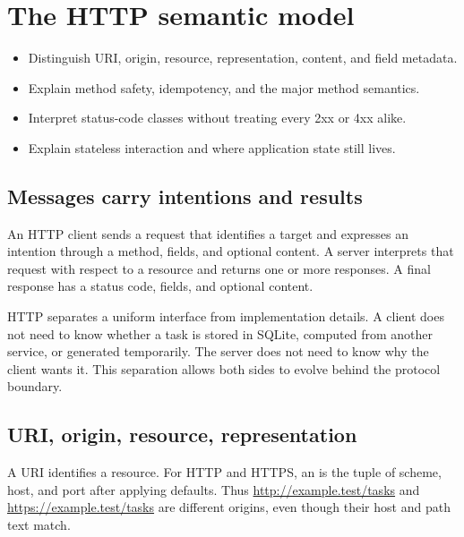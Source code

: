 \chapter{The HTTP semantic model}

\begin{objectives}
\begin{itemize}
  \item Distinguish URI, origin, resource, representation, content, and field metadata.
  \item Explain method safety, idempotency, and the major method semantics.
  \item Interpret status-code classes without treating every 2xx or 4xx alike.
  \item Explain stateless interaction and where application state still lives.
\end{itemize}
\end{objectives}

\section{Messages carry intentions and results}

An HTTP client sends a request that identifies a target and expresses an
intention through a method, fields, and optional content. A server interprets
that request with respect to a resource and returns one or more responses. A
final response has a status code, fields, and optional content.

HTTP separates a uniform interface from implementation details. A client does
not need to know whether a task is stored in SQLite, computed from another
service, or generated temporarily. The server does not need to know why the
client wants it. This separation allows both sides to evolve behind the protocol
boundary.

\section{URI, origin, resource, representation}

A URI identifies a resource. For HTTP and HTTPS, an  is the tuple
of scheme, host, and port after applying defaults. Thus
\url{http://example.test/tasks} and
\url{https://example.test/tasks} are different origins, even though their host
and path text match.


